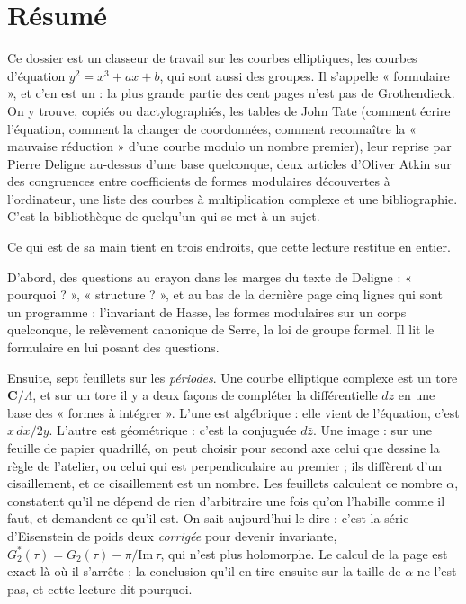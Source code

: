\documentclass[11pt,a4paper]{article}
\begin{document}
\section*{Résumé}

\begin{resume}
Ce dossier est un classeur de travail sur les courbes elliptiques, les
courbes d'équation $y^2 = x^3 + ax + b$, qui sont aussi des groupes. Il
s'appelle « formulaire », et c'en est un : la plus grande partie des cent pages
n'est pas de Grothendieck. On y trouve, copiés ou dactylographiés, les tables
de John Tate (comment écrire l'équation, comment la changer de coordonnées,
comment reconnaître la « mauvaise réduction » d'une courbe modulo un nombre
premier), leur reprise par Pierre Deligne au-dessus d'une base quelconque,
deux articles d'Oliver Atkin sur des congruences entre coefficients de formes
modulaires découvertes à l'ordinateur, une liste des courbes à multiplication
complexe et une bibliographie. C'est la bibliothèque de quelqu'un qui se met
à un sujet.

Ce qui est de sa main tient en trois endroits, que cette lecture
restitue en entier.

D'abord, des questions au crayon dans les marges du texte de Deligne :
« pourquoi ? », « structure ? », et au bas de la dernière page cinq lignes qui
sont un programme : l'invariant de Hasse, les formes modulaires sur un corps
quelconque, le relèvement canonique de Serre, la loi de groupe formel. Il lit le formulaire en lui posant des questions.

Ensuite, sept feuillets sur les \emph{périodes}. Une courbe elliptique
complexe est un tore $\mathbf{C}/\Lambda$, et sur un tore il y a deux façons de
compléter la différentielle $dz$ en une base des « formes à intégrer ». L'une
est algébrique : elle vient de l'équation, c'est $x\,dx/2y$. L'autre est
géométrique : c'est la conjuguée $d\bar z$. Une image : sur une feuille de
papier quadrillé, on peut choisir pour second axe celui que dessine la règle de
l'atelier, ou celui qui est perpendiculaire au premier ; ils diffèrent d'un
cisaillement, et ce cisaillement est un nombre. Les feuillets calculent ce
nombre $\alpha$, constatent qu'il ne dépend de rien d'arbitraire une fois
qu'on l'habille comme il faut, et demandent ce qu'il est. On sait aujourd'hui
le dire : c'est la série d'Eisenstein de poids deux \emph{corrigée} pour
devenir invariante, $G_2^*(\tau) = G_2(\tau) - \pi/\mathrm{Im}\,\tau$, qui n'est
plus holomorphe. Le calcul de la page est exact là où il s'arrête ; la
conclusion qu'il en tire ensuite sur la taille de $\alpha$ ne l'est pas, et
cette lecture dit pourquoi.


\end{resume}
\end{document}
